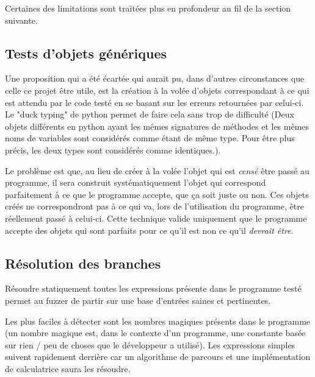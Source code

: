 \documentclass[a4paper]{report}
\begin{document}
Certaines des limitations sont traitées plus en profondeur au fil de la section suivante.


\subsection{Tests d'objets génériques}
Une proposition qui  a été écartée qui aurait pu, dans d'autres circonstances que celle ce projet être utile, est la création à la volée d'objets correspondant à ce qui est  attendu par le code testé en se basant sur les erreurs retournées par celui-ci.
Le "duck typing" de python permet de faire cela sans trop de difficulté (Deux objets différents en python ayant les mêmes signatures de méthodes et  les mêmes noms de variables sont considérés comme étant de même type. Pour être plus précis, les deux types sont considérés comme identiques.).

Le problème est que, au lieu de créer à la volée l'objet qui est \textit{censé} être passé au programme, il sera construit systématiquement l'objet qui correspond parfaitement à ce que le programme accepte, que ça soit juste ou non.
Ces objets créés ne correspondront pas à ce qui va, lors de l'utilisation du programme, être réellement passé à celui-ci.
Cette technique valide uniquement que le programme accepte des objets qui sont parfaits pour ce qu'il est non ce qu'il \textit{devrait être}.



\subsection{Résolution des branches}

Résoudre statiquement toutes les expressions présente dans le programme testé permet au fuzzer de partir sur une base d'entrées saines et pertinentes.

Les plus faciles à détecter sont les nombres magiques présents dans le programme (un nombre magique est, dans le contexte d'un programme, une constante basée sur rien / peu de choses que le développeur a utilisé).
Les expressions simples suivent rapidement derrière car un algorithme de parcours et une implémentation de calculatrice saura les résoudre.
\end{document}
